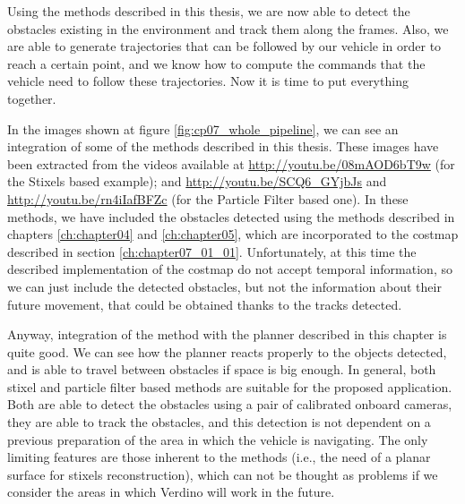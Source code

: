Using the methods described in this thesis, we are now able to detect the obstacles existing in the environment and track them along the frames. Also, we are able to generate trajectories that can be followed by our vehicle in order to reach a certain point, and we know how to compute the commands that the vehicle need to follow these trajectories. Now it is time to put everything together.

In the images shown at figure \ref{fig:cp07_whole_pipeline}, we can see an integration of some of the methods described in this thesis. These images have been extracted from the videos available at \url{http://youtu.be/08mAOD6bT9w} (for the Stixels based example); and \url{http://youtu.be/SCQ6_GYjbJs} and \url{http://youtu.be/rn4iIafBFZc} (for the Particle Filter based one). In these methods, we have included the obstacles detected using the methods described in chapters \ref{ch:chapter04} and \ref{ch:chapter05}, which are incorporated to the costmap described in section \ref{ch:chapter07_01_01}. Unfortunately, at this time the described implementation of the costmap do not accept temporal information, so we can just include the detected obstacles, but not the information about their future movement, that could be obtained thanks to the tracks detected.

Anyway, integration of the method with the planner described in this chapter is quite good. We can see how the planner reacts properly to the objects detected, and is able to travel between obstacles if space is big enough. In general, both stixel and particle filter based methods are suitable for the proposed application. Both are able to detect the obstacles using a pair of calibrated onboard cameras, they are able to track the obstacles, and this detection is not dependent on a previous preparation of the area in which the vehicle is navigating. The only limiting features are those inherent to the methods (i.e., the need of a planar surface for stixels reconstruction), which can not be thought as problems if we consider the areas in which Verdino will work in the future.

\FloatBarrier